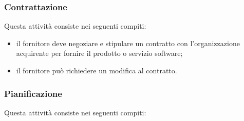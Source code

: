     \subsubsection{Contrattazione}\label{sec:contrattazione}
        Questa attività consiste nei seguenti compiti:
        \begin{itemize}
            \item il fornitore deve negoziare e stipulare un contratto con l'organizzazione acquirente per fornire il prodotto o servizio software;
            \item il fornitore può richiedere un modifica al contratto.
        \end{itemize}

    \subsubsection{Pianificazione}\label{sec:pianificazione}
        Questa attività consiste nei seguenti compiti:
